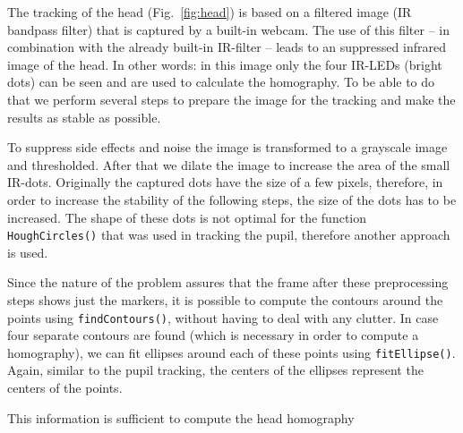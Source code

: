 The tracking of the head (Fig.~\ref{fig:head}) is based on a filtered image (IR bandpass filter) that is captured by a built-in webcam. The use of this filter -- in combination with the already built-in IR-filter -- leads to an suppressed infrared image of the head.
In other words: in this image only the four IR-LEDs (bright dots) can be seen and are used to calculate the homography. 
To be able to do that we perform several steps to prepare the image for the tracking and make the results as stable as possible.

To suppress side effects and noise the image is transformed to a grayscale image and thresholded. 
After that we dilate the image to increase the area of the small IR-dots. Originally the captured dots have the size of a few pixels, therefore, in order to increase the stability of the following steps, the size of the dots has to be increased. 
The shape of these dots is not optimal for the function \texttt{HoughCircles()} that was used in tracking the pupil, therefore another approach is used. 

Since the nature of the problem assures that the frame after these preprocessing steps shows just the markers, it is possible to compute the contours around the points using \texttt{findContours()}, without having to deal with any clutter. 
In case four separate contours are found (which is necessary in order to compute a homography), we can fit ellipses around each of these points using \texttt{fitEllipse()}. Again, similar to the pupil tracking, the centers of the ellipses represent the centers of the points.

This information is sufficient to compute the head homography
 
